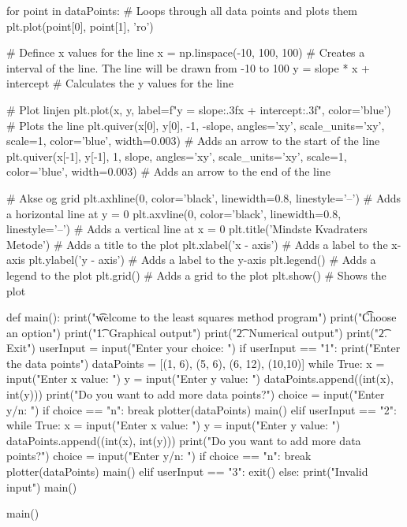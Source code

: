 \begin{python}
    for point in dataPoints: # Loops through all data points and plots them
        plt.plot(point[0], point[1], 'ro')
    
    # Defince x values for the line
    x = np.linspace(-10, 100, 100)  # Creates a interval of the line. The line will be drawn from -10 to 100
    y = slope * x + intercept # Calculates the y values for the line
    
    # Plot linjen
    plt.plot(x, y, label=f"y = {slope:.3f}x + {intercept:.3f}", color='blue') # Plots the line
    plt.quiver(x[0], y[0], -1, -slope, angles='xy', scale_units='xy', scale=1, color='blue', width=0.003) # Adds an arrow to the start of the line
    plt.quiver(x[-1], y[-1], 1, slope, angles='xy', scale_units='xy', scale=1, color='blue', width=0.003) # Adds an arrow to the end of the line
    
    # Akse og grid
    plt.axhline(0, color='black', linewidth=0.8, linestyle='--') # Adds a horizontal line at y = 0
    plt.axvline(0, color='black', linewidth=0.8, linestyle='--') # Adds a vertical line at x = 0
    plt.title('Mindste Kvadraters Metode') # Adds a title to the plot
    plt.xlabel('x - axis') # Adds a label to the x-axis
    plt.ylabel('y - axis') # Adds a label to the y-axis
    plt.legend() # Adds a legend to the plot
    plt.grid() # Adds a grid to the plot
    plt.show() # Shows the plot

def main():
    print("\t welcome to the least squares method program")
    print("\n \t Choose an option")
    print("\n \t 1. Graphical output")
    print("\n \t 2. Numerical output")
    print("\n \t 2. Exit")
    userInput = input("Enter your choice: ")
    if userInput == "1":
        print("Enter the data points")
        dataPoints = [(1, 6), (5, 6), (6, 12), (10,10)]
        while True:
            x = input("Enter x value: ")
            y = input("Enter y value: ")
            dataPoints.append((int(x), int(y)))
            print("Do you want to add more data points?")
            choice = input("Enter y/n: ")
            if choice == "n":
                break
        plotter(dataPoints)
        main()
    elif userInput == "2":
        while True:
            x = input("Enter x value: ")
            y = input("Enter y value: ")
            dataPoints.append((int(x), int(y)))
            print("Do you want to add more data points?")
            choice = input("Enter y/n: ")
            if choice == "n":
                break
        plotter(dataPoints)
        main()
    elif userInput == "3":
        exit()
    else:
        print("Invalid input")
        main()

main()
\end{python}